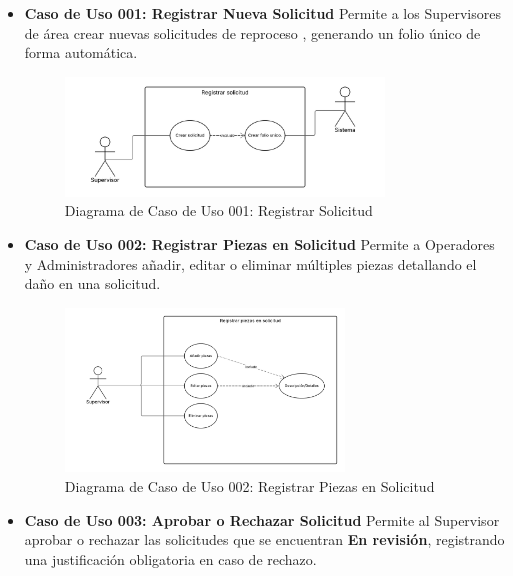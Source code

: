 \documentclass[12pt,letterpaper,spanish]{report}
\begin{document}
\begin{itemize}
    \item \textbf{Caso de Uso 001: Registrar Nueva Solicitud} 
    Permite a los Supervisores de área crear nuevas solicitudes de reproceso , generando un folio único de forma automática.
    
\begin{figure}[H]
  \centering
  \includegraphics[width=0.8\textwidth]{DIACU01 (1).png}
  \caption{Diagrama de Caso de Uso 001: Registrar Solicitud}\label{d01}
\end{figure}

    \item \textbf{Caso de Uso 002: Registrar Piezas en Solicitud} 
    Permite a Operadores y Administradores añadir, editar o eliminar múltiples piezas  detallando el daño en una solicitud.
    
    \begin{figure}[H]
  \centering
  \hspace*{-3.5 cm}
  \includegraphics[width=0.7\textwidth]{DIACU02.png}
  \caption{Diagrama de Caso de Uso 002: Registrar Piezas en Solicitud}\label{d02}
\end{figure}
        
    \item \textbf{Caso de Uso 003: Aprobar o Rechazar Solicitud}
    Permite al Supervisor aprobar o rechazar las solicitudes que se encuentran \textbf{En revisión}, registrando una justificación obligatoria en caso de rechazo.


\end{itemize}
\end{document}
